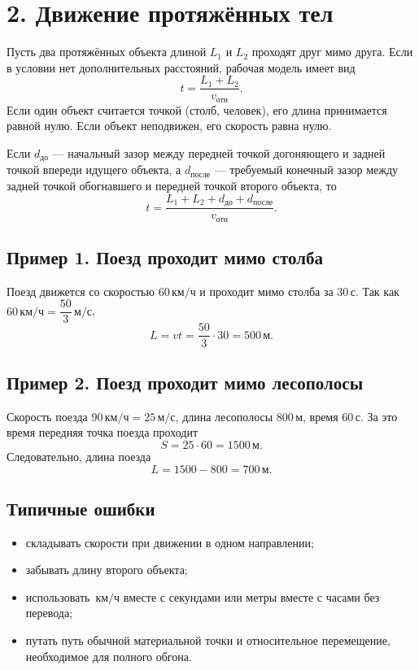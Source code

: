 \documentclass[a4paper,12pt]{article}
\newcommand{\sectionline}{\par\vspace{2mm}{\color{accent}\hrule height 0.7pt}\vspace{3mm}}
\newcommand{\unit}[1]{\,\text{#1}}
\begin{document}
\section*{2. Движение протяжённых тел}
\sectionline
Пусть два протяжённых объекта длиной \(L_1\) и \(L_2\) проходят друг мимо друга. Если в условии нет дополнительных расстояний, рабочая модель имеет вид
\[
\boxed{t=\frac{L_1+L_2}{v_{\text{отн}}}}.
\]
Если один объект считается точкой (столб, человек), его длина принимается равной нулю. Если объект неподвижен, его скорость равна нулю.

Если \(d_{\text{до}}\) --- начальный зазор между передней точкой догоняющего и задней точкой впереди идущего объекта, а \(d_{\text{после}}\) --- требуемый конечный зазор между задней точкой обогнавшего и передней точкой второго объекта, то
\[
\boxed{t=\frac{L_1+L_2+d_{\text{до}}+d_{\text{после}}}{v_{\text{отн}}}}.
\]

\subsection*{Пример 1. Поезд проходит мимо столба}
Поезд движется со скоростью \(60\unit{км/ч}\) и проходит мимо столба за \(30\unit{с}\). Так как \(60\unit{км/ч}=\dfrac{50}{3}\unit{м/с}\),
\[
L=vt=\frac{50}{3}\cdot 30=500\unit{м}.
\]

\subsection*{Пример 2. Поезд проходит мимо лесополосы}
Скорость поезда \(90\unit{км/ч}=25\unit{м/с}\), длина лесополосы \(800\unit{м}\), время \(60\unit{с}\). За это время передняя точка поезда проходит
\[
S=25\cdot60=1500\unit{м}.
\]
Следовательно, длина поезда
\[
L=1500-800=700\unit{м}.
\]

\subsection*{Типичные ошибки}
\begin{itemize}
\item складывать скорости при движении в одном направлении;
\item забывать длину второго объекта;
\item использовать \(\unit{км/ч}\) вместе с секундами или метры вместе с часами без перевода;
\item путать путь обычной материальной точки и относительное перемещение, необходимое для полного обгона.
\end{itemize}
\end{document}
